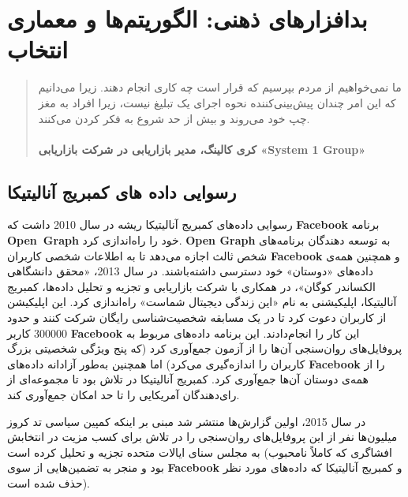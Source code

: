 

\chapter{بدافزارهای ذهنی: الگوریتم‌ها و معماری انتخاب}
\label{ch:بدافزارهای ذهنی الگوریتم‌ها و معماری انتخاب}

\begin{quote}
    ما نمی‌خواهیم از مردم بپرسیم که قرار است چه کاری انجام دهند.
    زیرا می‌دانیم که این امر چندان پیش‌بینی‌کننده نحوه اجرای یک تبلیغ نیست، زیرا افراد به مغز چپ خود می‌روند و بیش از حد شروع به فکر کردن می‌کنند.
    \\\\
    \textbf{کری کالینگ، مدیر بازاریابی در شرکت بازاریابی \textenglish{\textbf{«System 1 Group»}}}
    \newline
\end{quote}


{
\section*{رسوایی داده های کمبریج آنالیتیکا}
\label{sec:رسوایی داده های کمبریج آنالیتیکا}
رسوایی داده‌های کمبریج آنالیتیکا ریشه در سال 2010 داشت که \textenglish{\textbf{Facebook}} برنامه \\ \textenglish{\textbf{\mbox{Open Graph}}} خود را راه‌اندازی کرد. \textenglish{\textbf{Open Graph}} به توسعه دهندگان برنامه‌های شخص ثالث اجازه می‌دهد تا به اطلاعات شخصی کاربران \textenglish{\textbf{Facebook}} و همچنین همه‌ی داده‌های «دوستان» خود دسترسی داشته‌باشند. در سال 2013، «محقق دانشگاهی الکساندر کوگان»، در همکاری با شرکت بازاریابی و تجزیه و تحلیل داده‌ها، کمبریج آنالیتیکا، اپلیکیشنی به نام «این زندگی دیجیتال شماست» راه‌اندازی کرد. این اپلیکیشن از کاربران دعوت کرد تا در یک مسابقه شخصیت‌شناسی رایگان شرکت کنند و حدود 300000 کاربر \textenglish{\textbf{Facebook}} این کار را انجام‌دادند. این برنامه داده‌های مربوط به پروفایل‌های روان‌سنجی آن‌ها را از آزمون جمع‌آوری کرد (که پنج ویژگی شخصیتی بزرگ کاربران را اندازه‌گیری می‌کرد) اما همچنین به‌طور آزادانه داده‌های \textenglish{\textbf{Facebook}} را از همه‌ی دوستان آن‌ها جمع‌آوری کرد. کمبریج آنالیتیکا در تلاش بود تا مجموعه‌ای از رای‌دهندگان آمریکایی را تا حد امکان جمع‌آوری کند.
}

در سال 2015، اولین گزارش‌ها منتشر شد مبنی بر اینکه کمپین سیاسی تد کروز میلیون‌ها نفر از این پروفایل‌های روان‌سنجی را در تلاش برای کسب مزیت در انتخابش به مجلس سنای ایالات متحده تجزیه و تحلیل کرده است (افشاگری که کاملاً نامحبوب بود و منجر به تضمین‌هایی از سوی \textenglish{\textbf{Facebook}} و کمبریج آنالیتیکا که داده‌های مورد نظر حذف شده است).

